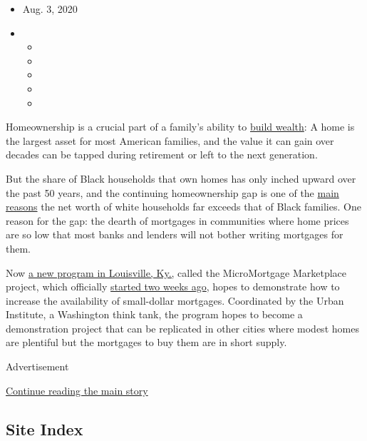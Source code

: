 \begin{itemize}
\item
  Aug. 3, 2020
\item
  \begin{itemize}
  \item
  \item
  \item
  \item
  \item
  \end{itemize}
\end{itemize}

Homeownership is a crucial part of a family's ability to
\href{https://www.nytimes3xbfgragh.onion/2020/06/09/your-money/race-income-equality.html}{build
wealth}: A home is the largest asset for most American families, and the
value it can gain over decades can be tapped during retirement or left
to the next generation.

But the share of Black households that own homes has only inched upward
over the past 50 years, and the continuing homeownership gap is one of
the
\href{https://www.brookings.edu/blog/up-front/2020/02/27/examining-the-black-white-wealth-gap/}{main
reasons} the net worth of white households far exceeds that of Black
families. One reason for the gap: the dearth of mortgages in communities
where home prices are so low that most banks and lenders will not bother
writing mortgages for them.

Now
\href{https://www.nytimes3xbfgragh.onion/2020/08/02/business/mortgages-affordable-housing.html}{a
new program in Louisville, Ky.,} called the MicroMortgage Marketplace
project, which officially
\href{https://www.newswire.com/news/micromortgage-marketplace-launches-in-support-of-small-dollar-home-21180593}{started
two weeks ago}, hopes to demonstrate how to increase the availability of
small-dollar mortgages. Coordinated by the Urban Institute, a Washington
think tank, the program hopes to become a demonstration project that can
be replicated in other cities where modest homes are plentiful but the
mortgages to buy them are in short supply.

Advertisement

\protect\hyperlink{after-bottom}{Continue reading the main story}

\hypertarget{site-index}{%
\subsection{Site Index}\label{site-index}}

